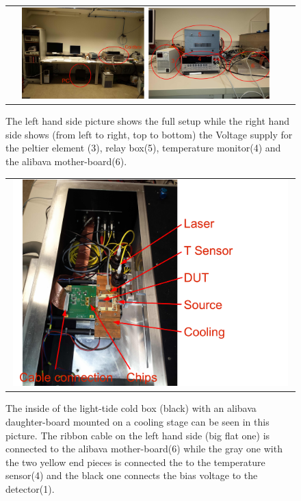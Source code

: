 \documentclass{article}
\begin{document}
\begin{figure}[tbhn]
\begin{center}
\begin{tabular}{cc}
\includegraphics[width=0.45\textwidth]{pictures/FullSetUp.pdf}
\includegraphics[width=0.45\textwidth]{pictures/3456.pdf}
\end{tabular}
\end{center}
\caption{The left hand side picture shows the full setup while the right hand side shows (from left to right, top to bottom) the Voltage supply for the peltier element (3), relay box(5), temperature monitor(4) and the alibava mother-board(6).}
\label{fig:MainUnits}
\end{figure}
\begin{figure}[tbhn]
\begin{center}
\begin{tabular}{c}
\includegraphics[width=0.98\textwidth]{pictures/InsideTheBox.pdf}
\end{tabular}
\end{center}
\caption{The inside of the light-tide cold box (black) with an alibava daughter-board mounted on a cooling stage can be seen in this picture. The ribbon cable on the left hand side (big flat one) is connected to the alibava mother-board(6) while the gray one with the two yellow end pieces is connected the to the temperature sensor(4) and the black one connects the bias voltage to the detector(1).}
\label{fig:InsideTheBox}
\end{figure}
\end{document}
